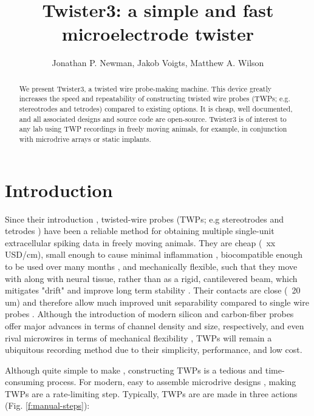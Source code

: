 \documentclass[11pt,a4paper]{article}
\title{Twister3: a simple and fast microelectrode twister}
\author{Jonathan P. Newman, Jakob Voigts, Matthew A. Wilson}
\begin{document}
\maketitle

\begin{abstract}
    \noindent
    We present Twister3, a twisted wire probe-making machine. This device
    greatly increases the speed and repeatability of constructing twisted wire
    probes (TWPs; e.g. stereotrodes and tetrodes) compared to existing options.
    It is cheap, well documented, and all associated designs and source code
    are open-source. Twister3 is of interest to any lab using TWP recordings in
    freely moving animals, for example, in conjunction with microdrive arrays
    or static implants.
\end{abstract}

\section{Introduction}
Since their introduction \cite{}, twisted-wire probes (TWPs; e.g stereotrodes
\cite{} and tetrodes \cite{}) have been a reliable method for obtaining
multiple single-unit extracellular spiking data in freely moving animals. They
are cheap (~xx USD/cm), small enough to cause minimal inflammation \cite{},
biocompatible enough to be used over many months \cite{}, and mechanically
flexible, such that they move with along with neural tissue, rather than as a
rigid, cantilevered beam, which mitigates "drift" \cite{} and improve long term
stability \cite{}. Their contacts are close (~20 um) and therefore allow much
improved unit separability compared to single wire probes \cite{}. Although the
introduction of modern silicon \cite{} and carbon-fiber probes \cite{} offer
major advances in terms of channel density and size, respectively, and even
rival microwires in terms of mechanical flexibility \cite{}, TWPs will remain a
ubiquitous recording method due to their simplicity, performance, and low cost.

Although quite simple to make \cite{}, constructing TWPs is a tedious and
time-consuming process. For modern, easy to assemble microdrive designs \cite{},
making TWPs are a rate-limiting step. Typically, TWPs are are
made in three actions (Fig. \ref{f:manual-steps}):
\end{document}
